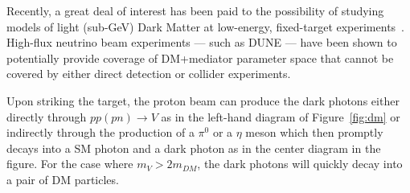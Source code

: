   Recently, a great deal of interest has been paid to the possibility
  of studying models of light (sub-GeV) Dark Matter at low-energy,
  fixed-target
  experiments~\cite{Batell:2009di,deNiverville:2011it,deNiverville:2012ij,Dharmapalan:2012xp}.
  High-flux neutrino beam experiments --- such as DUNE --- have been
  shown to potentially provide coverage of DM+mediator parameter space
  that cannot be covered by either direct detection or collider
  experiments.

Upon striking the target, the proton beam can produce the dark photons
either directly through $pp(pn)\rightarrow {V}$ %
as in the left-hand diagram of Figure~\ref{fig:dm} or indirectly
through the production of a $\pi^{0}$ or a $\eta$ meson which then
promptly decays into a SM photon and a dark photon as in the center
diagram in the figure. %
For the case where $m_{V} > 2m_{DM}$, the dark photons will quickly
decay into a pair of DM particles.
%
